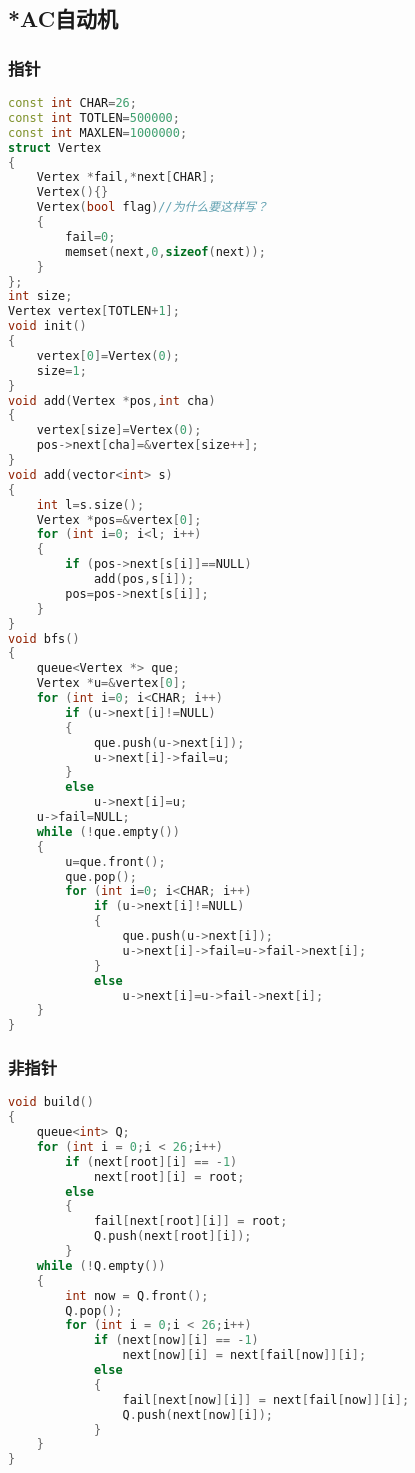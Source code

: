 \subsection{*AC自动机}
    \subsubsection{指针}
        \begin{lstlisting}[language=c++]
const int CHAR=26;
const int TOTLEN=500000;
const int MAXLEN=1000000;
struct Vertex
{
    Vertex *fail,*next[CHAR];
    Vertex(){}
    Vertex(bool flag)//为什么要这样写？
    {
        fail=0;
        memset(next,0,sizeof(next));
    }
};
int size;
Vertex vertex[TOTLEN+1];
void init()
{
    vertex[0]=Vertex(0);
    size=1;
}
void add(Vertex *pos,int cha)
{
    vertex[size]=Vertex(0);
    pos->next[cha]=&vertex[size++];
}
void add(vector<int> s)
{
    int l=s.size();
    Vertex *pos=&vertex[0];
    for (int i=0; i<l; i++)
    {
        if (pos->next[s[i]]==NULL)
            add(pos,s[i]);
        pos=pos->next[s[i]];
    }
}
void bfs()
{
    queue<Vertex *> que;
    Vertex *u=&vertex[0];
    for (int i=0; i<CHAR; i++)
        if (u->next[i]!=NULL)
        {
            que.push(u->next[i]);
            u->next[i]->fail=u;
        }
        else
            u->next[i]=u;
    u->fail=NULL;
    while (!que.empty())
    {
        u=que.front();
        que.pop();
        for (int i=0; i<CHAR; i++)
            if (u->next[i]!=NULL)
            {
                que.push(u->next[i]);
                u->next[i]->fail=u->fail->next[i];
            }
            else
                u->next[i]=u->fail->next[i];
    }
}
        \end{lstlisting}
    \subsubsection{非指针}
        \begin{lstlisting}[language=c++]
void build()
{
    queue<int> Q;
    for (int i = 0;i < 26;i++)
        if (next[root][i] == -1)
            next[root][i] = root;
        else
        {
            fail[next[root][i]] = root;
            Q.push(next[root][i]);
        }
    while (!Q.empty())
    {
        int now = Q.front();
        Q.pop();
        for (int i = 0;i < 26;i++)
            if (next[now][i] == -1)
                next[now][i] = next[fail[now]][i];
            else
            {
                fail[next[now][i]] = next[fail[now]][i];
                Q.push(next[now][i]);
            }
    }
}
        \end{lstlisting}